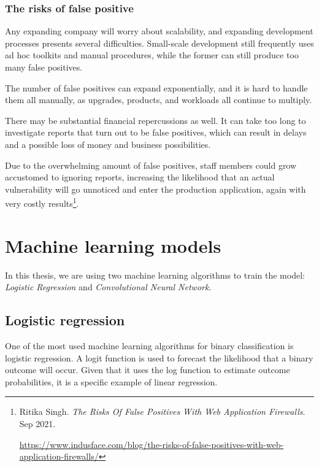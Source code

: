 \subsubsection{The risks of false positive} 
\hspace{0.5cm}Any expanding company will worry about scalability, and expanding development processes presents several difficulties. Small-scale development still frequently uses ad hoc toolkits and manual procedures, while the former can still produce too many false positives.

The number of false positives can expand exponentially, and it is hard to handle them all manually, as upgrades, products, and workloads all continue to multiply.

There may be substantial financial repercussions as well. It can take too long to investigate reports that turn out to be false positives, which can result in delays and a possible loss of money and business possibilities.

Due to the overwhelming amount of false positives, staff members could grow accustomed to ignoring reports, increasing the likelihood that an actual vulnerability will go unnoticed and enter the production application, again with very costly results\footnote{Ritika Singh. \textit{The Risks Of False Positives With Web Application Firewalls}. Sep 2021. \raggedright\url{https://www.indusface.com/blog/the-risks-of-false-positives-with-web-application-firewalls/}}.

\newpage
\section{Machine learning models} 
\label{sec:machine_model}
\hspace{0.5cm}In this thesis, we are using two machine learning algorithms to train the model: \textit{Logistic Regression} and \textit{Convolutional Neural Network}.
\subsection{Logistic regression}
\label{subsec:logistic_regression}
\hspace{0.5cm}One of the most used machine learning algorithms for binary classification is logistic regression. A logit function is used to forecast the likelihood that a binary outcome will occur. Given that it uses the log function to estimate outcome probabilities, it is a specific example of linear regression.

